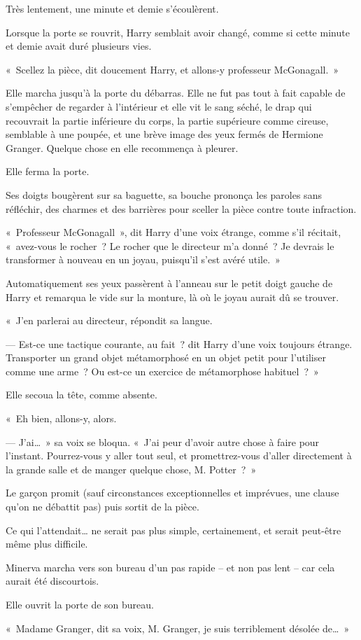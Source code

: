 Très lentement, une minute et demie s'écoulèrent.

\later

Lorsque la porte se rouvrit, Harry semblait avoir changé, comme si cette minute et demie avait duré plusieurs vies.

«~Scellez la pièce, dit doucement Harry, et allons-y professeur McGonagall.~»

Elle marcha jusqu'à la porte du débarras.
Elle ne fut pas tout à fait capable de s'empêcher de regarder à l'intérieur et elle vit le sang séché, le drap qui recouvrait la partie inférieure du corps, la partie supérieure comme cireuse, semblable à une poupée, et une brève image des yeux fermés de Hermione Granger.
Quelque chose en elle recommença à pleurer.

Elle ferma la porte.

Ses doigts bougèrent sur sa baguette, sa bouche prononça les paroles sans réfléchir, des charmes et des barrières pour sceller la pièce contre toute infraction.

«~Professeur McGonagall~», dit Harry d'une voix étrange, comme s'il récitait, «~avez-vous le rocher~?
Le rocher que le directeur m'a donné~?
Je devrais le transformer à nouveau en un joyau, puisqu'il s'est avéré utile.~»

Automatiquement ses yeux passèrent à l'anneau sur le petit doigt gauche de Harry et remarqua le vide sur la monture, là où le joyau aurait dû se trouver.

«~J'en parlerai au directeur, répondit sa langue.

--- Est-ce une tactique courante, au fait~? dit Harry d'une voix toujours étrange.
Transporter un grand objet métamorphosé en un objet petit pour l'utiliser comme une arme~?
Ou est-ce un exercice de métamorphose habituel~?~»

Elle secoua la tête, comme absente.

«~Eh bien, allons-y, alors.

--- J'ai…~»
sa voix se bloqua.
«~J'ai peur d'avoir autre chose à faire pour l'instant.
Pourrez-vous y aller tout seul, et promettrez-vous d'aller directement à la grande salle et de manger quelque chose, M. Potter~?~»

Le garçon promit (sauf circonstances exceptionnelles et imprévues, une clause qu'on ne débattit pas) puis sortit de la pièce.

Ce qui l'attendait… ne serait pas plus simple, certainement, et serait peut-être même plus difficile.

\later

Minerva marcha vers son bureau d'un pas rapide -- et non pas lent -- car cela aurait été discourtois.

Elle ouvrit la porte de son bureau.

«~Madame Granger, dit sa voix, M. Granger, je suis terriblement désolée de…~»

